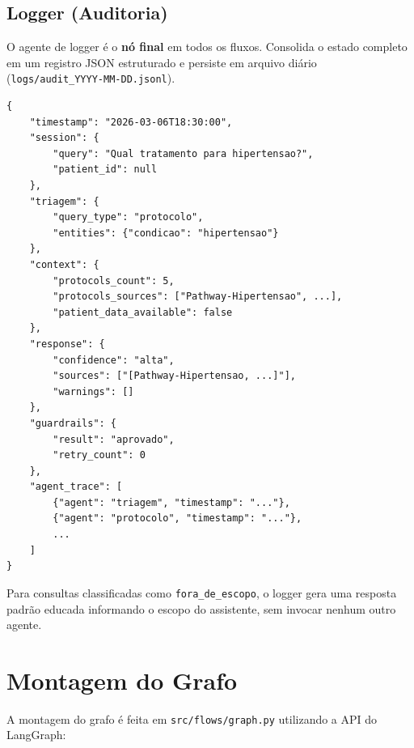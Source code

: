 \subsection{Logger (Auditoria)}

O agente de logger é o \textbf{nó final} em todos os fluxos. Consolida o estado completo em um registro JSON estruturado e persiste em arquivo diário (\texttt{logs/audit\_YYYY-MM-DD.jsonl}).

\begin{lstlisting}[caption={Estrutura do registro de auditoria.}]
{
    "timestamp": "2026-03-06T18:30:00",
    "session": {
        "query": "Qual tratamento para hipertensao?",
        "patient_id": null
    },
    "triagem": {
        "query_type": "protocolo",
        "entities": {"condicao": "hipertensao"}
    },
    "context": {
        "protocols_count": 5,
        "protocols_sources": ["Pathway-Hipertensao", ...],
        "patient_data_available": false
    },
    "response": {
        "confidence": "alta",
        "sources": ["[Pathway-Hipertensao, ...]"],
        "warnings": []
    },
    "guardrails": {
        "result": "aprovado",
        "retry_count": 0
    },
    "agent_trace": [
        {"agent": "triagem", "timestamp": "..."},
        {"agent": "protocolo", "timestamp": "..."},
        ...
    ]
}
\end{lstlisting}

Para consultas classificadas como \texttt{fora\_de\_escopo}, o logger gera uma resposta padrão educada informando o escopo do assistente, sem invocar nenhum outro agente.

\section{Montagem do Grafo}\label{sec:montagem}

A montagem do grafo é feita em \texttt{src/flows/graph.py} utilizando a API do LangGraph:

